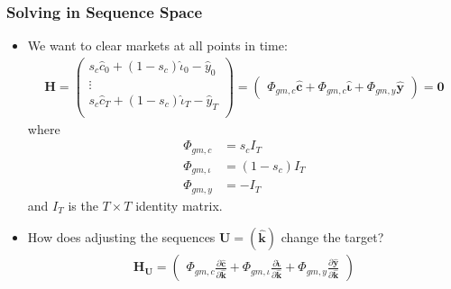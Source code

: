 \documentclass[english,xcolor=svgnames]{beamer}
\begin{document}
	\begin{frame}
		\frametitle{Solving in Sequence Space}
			\begin{itemize}
				\item We want to clear markets at all points in time:
				\begin{align*}
					\mathbf{H} = \begin{pmatrix}
						s_c \hat{c}_0 +(1-s_c) \hat{\iota}_0- \hat{y}_0 \\
						\vdots \\
						s_c \hat{c}_T +(1-s_c) \hat{\iota}_T  - \hat{y}_T \\
					\end{pmatrix} = \begin{pmatrix}
						\Phi_{gm,c}\mathbf{\hat{c}} + \Phi_{gm,c}\mathbf{\hat{\iota}} +  \Phi_{gm,y}\mathbf{\hat{y}} 
					\end{pmatrix} = \mathbf{0}
				\end{align*}
				where
				\begin{align*}
					\Phi_{gm,c} &= s_c I_T \\
					\Phi_{gm,\iota} &= (1 - s_c) I_T \\
					\Phi_{gm,y} &= -I_T
				\end{align*}
				and $I_T$ is the $T\times T$ identity matrix.
				\item How does adjusting the sequences $\mathbf{U} = (\mathbf{\hat{k}})$ change the target?
				\begin{align*}
					\mathbf{H}_{\mathbf{U}} = \begin{pmatrix}
						\Phi_{gm,c}\frac{\partial\mathbf{\hat{c}}}{\partial \mathbf{\hat{k}} } + \Phi_{gm,\iota}\frac{\partial\mathbf{\hat{\iota}}}{\partial \mathbf{\hat{k}} } +  \Phi_{gm,y}\frac{\partial\mathbf{\hat{y}}}{\partial \mathbf{\hat{k}} }
					\end{pmatrix}
				\end{align*}
			\end{itemize}
	\end{frame}
	
\end{document}
